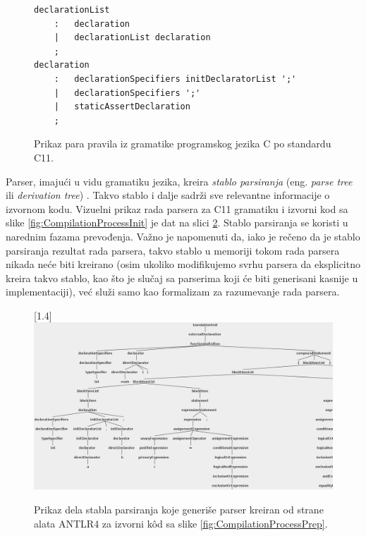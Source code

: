 \begin{figure}[h!]
\begin{lstlisting}[language={}]
declarationList
    :   declaration
    |   declarationList declaration
    ;
declaration
    :   declarationSpecifiers initDeclaratorList ';'
    | 	declarationSpecifiers ';'
    |   staticAssertDeclaration
    ;
\end{lstlisting}
\caption{Prikaz para pravila iz gramatike programskog jezika C po standardu C11.}
\label{fig:CompilationProcessGram}
\end{figure}

Parser, imajući u vidu gramatiku jezika, kreira \emph{stablo parsiranja} (eng. \emph{parse tree} ili \emph{derivation tree}) \cite{AutomataTheory}. Takvo stablo i dalje sadrži sve relevantne informacije o izvornom kodu. Vizuelni prikaz rada parsera za C11 gramatiku i izvorni kod sa slike \ref{fig:CompilationProcessInit} je dat na slici \ref{fig:CompilationProcessPars}. Stablo parsiranja se koristi u narednim fazama prevođenja. Važno je napomenuti da, iako je rečeno da je stablo parsiranja rezultat rada parsera, takvo stablo u memoriji tokom rada parsera nikada neće biti kreirano (osim ukoliko modifikujemo svrhu parsera da eksplicitno kreira takvo stablo, kao što je slučaj sa parserima koji će biti generisani kasnije u implementaciji), već služi samo kao formalizam za razumevanje rada parsera.

\begin{figure}[h!]
\centering
\scalebox{1}[1.4] {
    \includegraphics[width=\textwidth]{images/parse_tree.png}
}
\caption{Prikaz dela stabla parsiranja koje generiše parser kreiran od strane alata ANTLR4 \cite{ANTLR} za izvorni k\^od sa slike \ref{fig:CompilationProcessPrep}.}
\label{fig:CompilationProcessPars}
\end{figure}

